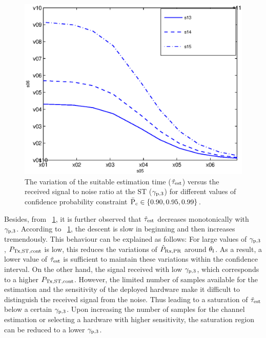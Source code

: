 \begin{figure}
	\centering
	
	\includegraphics[width=\figscale]{figures/test_SNR}
	\caption{The variation of the suitable estimation time ($\tilde{\tau}_{\text{est}}$) versus the received signal to noise ratio at the ST (${\gamma}_{\text{p,3}}$) for different values of confidence probability constraint $\bar{\text{P}}_{\text{c}} \in \{0.90,0.95,0.99 \}$.}
	\label{fig_HVD:Tausnr}
\end{figure}

Besides, from \figurename~\ref{fig_HVD:Tausnr}, it is further observed that $\tilde{\tau}_{\text{est}}$ decreases monotonically with ${\gamma}_{\text{p,3}}$. According to \figurename~\ref{fig_HVD:Tausnr}, the descent is slow in beginning and then increases tremendously. %
This behaviour can be explained as follows: For large values of ${\gamma}_{\text{p,3}}$, $P_{\text{Tx,ST,cont}}$ is low, this reduces the variations of $\hat{P}_{\text{Rx,PR}}$ around $\theta_{\text{I}}$. As a result, a lower value of $\tilde{\tau}_{\text{est}}$ is sufficient to maintain these variations within the confidence interval. On the other hand, the signal received with low ${\gamma}_{\text{p,3}}$, which corresponds to a higher $P_{\text{Tx,ST,cont}}$. However, the limited number of samples available for the estimation and the sensitivity of the deployed hardware make it difficult to distinguish the received signal from the noise. Thus leading to a saturation of $\tilde{\tau}_{\text{est}}$ below a certain ${\gamma}_{\text{p,3}}$. Upon increasing the number of samples for the channel estimation or selecting a hardware with higher sensitivity, the saturation region can be reduced to a lower ${\gamma}_{\text{p,3}}$. 

